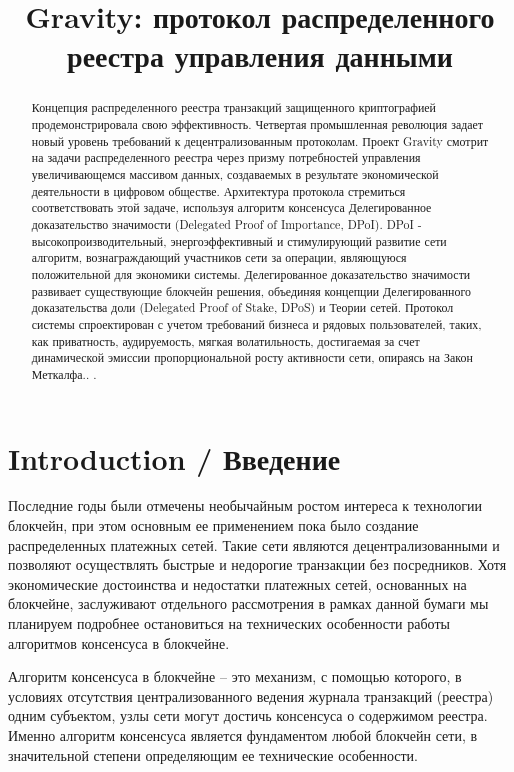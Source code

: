 \documentclass[a4paper,12pt]{article}
\title{Gravity: протокол распределенного реестра управления данными}
\author{}
\begin{document}
\maketitle

\begin{abstract}
Концепция распределенного реестра транзакций защищенного криптографией продемонстрировала свою эффективность. Четвертая промышленная революция задает новый уровень требований к децентрализованным протоколам. Проект Gravity смотрит на задачи распределенного реестра через призму потребностей управления увеличивающемся массивом данных, создаваемых в результате экономической деятельности в цифровом обществе.  Архитектура протокола стремиться соответствовать этой задаче, используя алгоритм консенсуса Делегированное доказательство значимости (Delegated Proof of Importance, DPoI). DPoI - высокопроизводительный, энергоэффективный и стимулирующий развитие сети алгоритм, вознаграждающий участников сети за операции, являющуюся положительной для экономики системы. Делегированное доказательство значимости развивает существующие блокчейн решения, объединяя концепции  Делегированного доказательства доли (Delegated Proof of Stake, DPoS) и Теории сетей. Протокол системы спроектирован с учетом требований бизнеса и рядовых пользователей, таких, как приватность, аудируемость, мягкая волатильность, достигаемая за счет динамической эмиссии пропорциональной росту активности сети, опираясь на Закон Меткалфа.. \cite{Metcalfe}.
\end{abstract}

\section{Introduction / Введение}

Последние годы были отмечены необычайным ростом интереса к технологии блокчейн, при этом основным ее применением пока было создание распределенных платежных сетей. Такие сети являются децентрализованными и позволяют осуществлять быстрые и недорогие транзакции без посредников. Хотя экономические достоинства и недостатки платежных сетей, основанных на блокчейне, заслуживают отдельного рассмотрения в рамках данной бумаги мы планируем подробнее остановиться на технических особенности работы алгоритмов консенсуса в блокчейне.

Алгоритм консенсуса в блокчейне – это механизм, с помощью которого, в условиях отсутствия централизованного ведения журнала транзакций (реестра) одним субъектом, узлы сети могут достичь консенсуса о содержимом реестра. Именно алгоритм консенсуса является фундаментом любой блокчейн сети, в значительной степени определяющим ее технические особенности.
\end{document}
